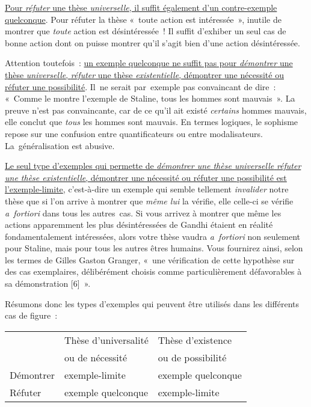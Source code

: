\documentclass[a4paper,12pt]{article}
\begin{document}
\uline{Pour \emph{réfuter} une thèse \emph{universelle}, il suffit également d'un
contre-exemple quelconque}. Pour réfuter la thèse « toute action est
intéressée », inutile de montrer que \emph{toute} action est désintéressée !
Il suffit d'exhiber un seul cas de bonne action dont on puisse montrer
qu'il s'agit bien d'une action désintéressée.

Attention toutefois : \uline{un exemple quelconque ne suffit pas pour
\emph{démontrer} une thèse \emph{universelle}, \emph{réfuter} une thèse
\emph{existentielle}, démontrer une nécessité ou réfuter une possibilité}.
Il ne serait par exemple pas convaincant de dire : « Comme le montre
l'exemple de Staline, tous les hommes sont mauvais ». La preuve n'est
pas convaincante, car de ce qu'il ait existé \emph{certains} hommes mauvais,
elle conclut que \emph{tous} les hommes sont mauvais. En termes logiques, le
sophisme repose sur une confusion entre quantificateurs ou entre
modalisateurs. La généralisation est abusive.

\uline{Le seul type d'exemples qui permette de \emph{démontrer une thèse
universelle} \emph{réfuter une thèse existentielle}, démontrer une nécessité
ou réfuter une possibilité est l'exemple-limite}, c'est-à-dire un
exemple qui semble tellement \emph{invalider} notre thèse que si l'on arrive
à montrer que \emph{même lui} la vérifie, elle celle-ci se vérifie
\emph{a fortiori} dans tous les autres cas. Si vous arrivez à montrer que
même les actions apparemment les plus désintéressées de Gandhi étaient
en réalité fondamentalement intéressées, alors votre thèse vaudra
\emph{a fortiori} non seulement pour Staline, mais pour tous les autres êtres
humains. Vous fournirez ainsi, selon les termes de Gilles Gaston
Granger, « une vérification de cette hypothèse sur des cas exemplaires,
délibérément choisis comme particulièrement défavorables à sa
démonstration [6] ».

Résumons donc les types d'exemples qui peuvent être utilisés dans les
différents cas de figure :
\begin{center}
\begin{tabular}{|l|l|l|}
\hline
 & Thèse d'universalité & Thèse d'existence\\
 & ou de nécessité & ou de possibilité\\
\hline
Démontrer & exemple-limite & exemple quelconque\\
\hline
Réfuter & exemple quelconque & exemple-limite\\
\hline
\end{tabular}
\end{center}
\end{document}
